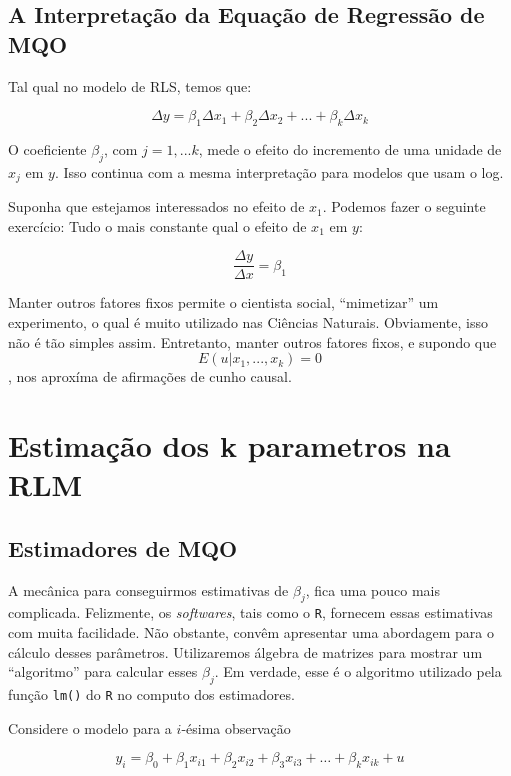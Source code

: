 \documentclass[
  letterpaper,
  DIV=11,
  numbers=noendperiod]{scrreprt}
\begin{document}
\subsection{A Interpretação da Equação de Regressão de
MQO}\label{a-interpretauxe7uxe3o-da-equauxe7uxe3o-de-regressuxe3o-de-mqo}

Tal qual no modelo de RLS, temos que:

\[\Delta y = \beta_1 \Delta x_1 + \beta_2 \Delta x_2 + ...+\beta_k \Delta x_k\]

O coeficiente \(\beta_j\), com \(j=1,...k\), mede o efeito do incremento
de uma unidade de \(x_j\) em \(y\). Isso continua com a mesma
interpretação para modelos que usam o log.

Suponha que estejamos interessados no efeito de \(x_1\). Podemos fazer o
seguinte exercício: Tudo o mais constante qual o efeito de \(x_1\) em
\(y\):

\[\frac{\Delta y}{\Delta x} = \beta_1 \]

Manter outros fatores fixos permite o cientista social, ``mimetizar'' um
experimento, o qual é muito utilizado nas Ciências Naturais. Obviamente,
isso não é tão simples assim. Entretanto, manter outros fatores fixos, e
supondo que \[E(u|x_1, . . . ,x_k) = 0\] , nos aproxíma de afirmações de
cunho causal.

\section{Estimação dos k parametros na
RLM}\label{estimauxe7uxe3o-dos-k-parametros-na-rlm}

\subsection{Estimadores de MQO}\label{estimadores-de-mqo}

A mecânica para conseguirmos estimativas de \(\beta_j\), fica uma pouco
mais complicada. Felizmente, os \emph{softwares}, tais como o
\texttt{R}, fornecem essas estimativas com muita facilidade. Não
obstante, convêm apresentar uma abordagem para o cálculo desses
parâmetros. Utilizaremos álgebra de matrizes para mostrar um
``algoritmo'' para calcular esses \(\beta_j\). Em verdade, esse é o
algoritmo utilizado pela função \texttt{lm()} do \texttt{R} no computo
dos estimadores.

Considere o modelo para a \(i\)-ésima observação

\[y_i = \beta_0 + \beta_1 x_{i1} + \beta_{2} x_{i2} + \beta_{3} x_{i3} + \ldots + \beta_k x_{ik} + u\]
\end{document}
